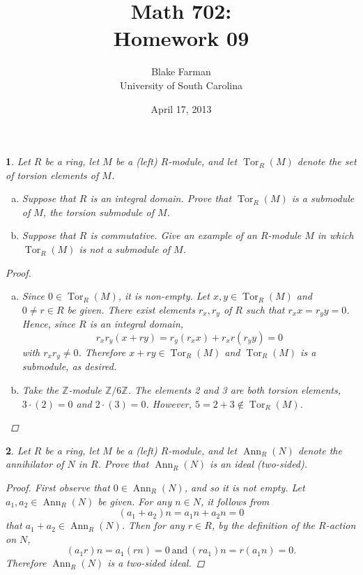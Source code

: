 \documentclass[10pt]{amsart}
\author{Blake Farman\\University of South Carolina}
\title{Math 702:\\Homework 09}
\date{April 17, 2013}
\newcommand{\Z}{\mathbb{Z}}
\newcommand{\Tor}[2]{\operatorname{Tor}_{#1}\left(#2\right)}
\newcommand{\Ann}[2]{\operatorname{Ann}_{#1}\left(#2\right)}
\begin{document}
\maketitle

\providecommand{\p}{\mathfrak{p}}
\providecommand{\m}{\mathfrak{m}}

\newtheorem{thm}{}
\newtheorem{lem}{Lemma}

\begin{thm}
	Let $R$ be a ring, let $M$ be a (left) $R$-module, and let $\Tor{R}{M}$ denote the set of torsion elements of $M$.
	\begin{enumerate}[(a)]
		\item
			Suppose that $R$ is an integral domain.
			Prove that $\Tor{R}{M}$ is a submodule of $M$, the torsion submodule of $M$.
		\item
			Suppose that $R$ is commutative.
			Give an example of an $R$-module $M$ in which $\Tor{R}{M}$ is not a submodule of $M$.
	\end{enumerate}
	
	\begin{proof}
		\begin{enumerate}[(a)]
			\item
				Since $0 \in \Tor{R}{M}$, it is non-empty.
				Let $x,y \in \Tor{R}{M}$ and $0 \neq r \in R$ be given.
				There exist elements $r_x, r_y$ of $R$ such that $r_x x = r_y y = 0$.
				Hence, since $R$ is an integral domain,
				$$r_x r_y(x + ry) = r_y(r_x x) + r_x r(r_y y) = 0$$
				with $r_x r_y \neq 0$.
				Therefore $x + ry \in \Tor{R}{M}$ and $\Tor{R}{M}$ is a submodule, as desired.
			\item
				Take the $\Z$-module $\Z/6\Z$.
				The elements 2 and 3 are both torsion elements, $3 \cdot (2) = 0$ and $2 \cdot (3) = 0$.
				However, $5 = 2 + 3 \not \in \Tor{R}{M}$.
		\end{enumerate}
	\end{proof}
\end{thm}

\begin{thm}
	Let $R$ be a ring, let $M$ be a (left) $R$-module, and let $\Ann{R}{N}$ denote the annihilator of $N$ in $R$.
	Prove that $\Ann{R}{N}$ is an ideal (two-sided).
	
	\begin{proof}
		First observe that $0 \in \Ann{R}{N}$, and so it is not empty.
		Let $a_1, a_2 \in \Ann{R}{N}$ be given.
		For any $n \in N$, it follows from
			$$(a_1 + a_2)n = a_1 n + a_2 n = 0$$
		that $a_1 + a_2 \in \Ann{R}{N}$.
		Then for any $r \in R$, by the definition of the $R$-action on $N$, 
		$$(a_1r)n = a_1(rn) = 0\ \text{and}\ (ra_1)n = r(a_1n) = 0.$$
		Therefore $\Ann{R}{N}$ is a two-sided ideal.
	\end{proof}
\end{thm}
\end{document}
